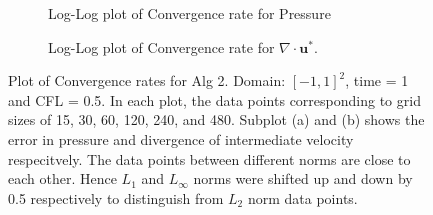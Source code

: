 \begin{figure}[H]
	\centering
	\begin{subfigure}[t]{4.5in}
		\centering
		\caption{Log-Log plot of Convergence rate for Pressure}\label{fig:6.3a}		
	\end{subfigure}
	\quad
	\begin{subfigure}[t]{4.5in}
		\centering
		\caption{Log-Log plot of Convergence rate for $\nabla \cdot \textbf{u}^*$. }\label{fig:6.3b}
	\end{subfigure}
	\caption{Plot of Convergence rates for Alg 2. Domain: $[-1,1]^2$, time = 1 and CFL = 0.5. In each plot, the data points corresponding to grid sizes of 15, 30, 60, 120, 240, and 480. Subplot (a) and (b) shows the error in pressure and divergence of intermediate velocity respecitvely. The data points between different norms are close to each other. Hence $L_1$ and $L_\infty$ norms were shifted up and down by 0.5 respectively to distinguish from $L_2$ norm data points.}\label{fig:6.3}
\end{figure}

